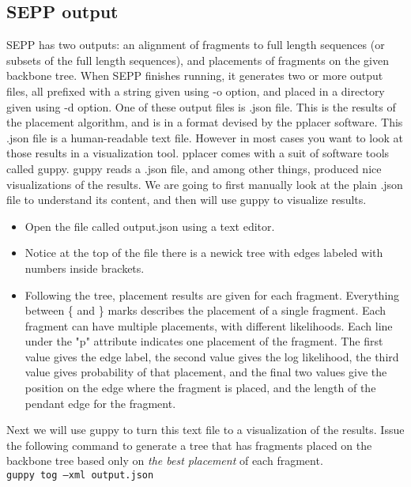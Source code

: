 \documentclass[11pt]{article} %
\newcommand{\sepp}{SEPP\xspace}
\newcommand{\ins}[1]{{\tt #1}}
\newcommand{\file}[1]{{\sf #1}}
\newcommand{\pplacer}{pplacer\xspace}
\newcommand{\guppy}{guppy\xspace}
\begin{document}
\subsection{\sepp output }
\sepp has two outputs: an alignment of fragments to full length sequences (or subsets of the full length sequences), and placements of fragments on the given backbone tree. When \sepp finishes running, it generates two or more output files, all prefixed with a string given using -o option, and placed in a directory given using -d option. One of these output files is \file{[prefix].json} file. This is the results of the placement algorithm, and is in a format devised by the \pplacer software. This .json file is a human-readable text file. However in most cases you want to look at those results in a visualization tool. \pplacer comes with a suit of software tools called \guppy. \guppy reads a \file{.json} file, and among other things, produced nice visualizations of the results. We are going to first manually look at the plain \file{.json} file to understand its content, and then will use \guppy to visualize results.   

\begin{itemize}
\item Open the file called \file{output.json} using a text editor. 
\item Notice at the top of the file there is a newick tree with edges labeled with numbers inside brackets. 
\item Following the tree, placement results are given for each fragment.  Everything between \{ and \} marks describes the placement of a single fragment. Each fragment can have multiple placements, with different likelihoods. Each line under the "p" attribute indicates one placement of the fragment. The first value gives the edge label, the second value gives the log likelihood, the third value gives probability of that placement, and the final two values give the position on the edge where the fragment is placed, and the length of the pendant edge for the fragment.
\end{itemize}

Next we will use \guppy to turn this text file to a visualization of the results. Issue the following command to generate a tree that has fragments placed on the backbone tree based only on {\em the best placement} of each fragment.\\

\ins{guppy tog --xml output.json}\\
\end{document}
